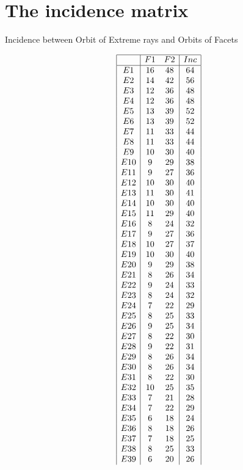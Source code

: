 \documentclass[12pt]{article}
\begin{document}
\section{The incidence matrix}
Incidence between Orbit of Extreme rays and Orbits of Facets
\newpage
\begin{multicols}{3}
\begin{equation*}
\begin{array}{|c|cc|c|}
\hline
&F1&F2&Inc\\
\hline
E1&16&48&64\\
E2&14&42&56\\
E3&12&36&48\\
E4&12&36&48\\
E5&13&39&52\\
E6&13&39&52\\
E7&11&33&44\\
E8&11&33&44\\
E9&10&30&40\\
E10&9&29&38\\
E11&9&27&36\\
E12&10&30&40\\
E13&11&30&41\\
E14&10&30&40\\
E15&11&29&40\\
E16&8&24&32\\
E17&9&27&36\\
E18&10&27&37\\
E19&10&30&40\\
E20&9&29&38\\
E21&8&26&34\\
E22&9&24&33\\
E23&8&24&32\\
E24&7&22&29\\
E25&8&25&33\\
E26&9&25&34\\
E27&8&22&30\\
E28&9&22&31\\
E29&8&26&34\\
E30&8&26&34\\
E31&8&22&30\\
E32&10&25&35\\
E33&7&21&28\\
E34&7&22&29\\
E35&6&18&24\\
E36&8&18&26\\
E37&7&18&25\\
E38&8&25&33\\
E39&6&20&26\\

\end{array}
\end{equation*}
\end{multicols}
\end{document}
